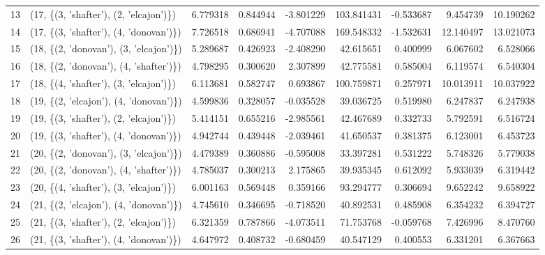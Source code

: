 \begin{tabular}{llrrrrrrr}
13 &  (17, \{(3, 'shafter'), (2, 'elcajon')\}) &  6.779318 &   0.844944 & -3.801229 &  103.841431 & -0.533687 &   9.454739 &  10.190262 \\
14 &  (17, \{(3, 'shafter'), (4, 'donovan')\}) &  7.726518 &   0.686941 & -4.707088 &  169.548332 & -1.532631 &  12.140497 &  13.021073 \\
15 &  (18, \{(2, 'donovan'), (3, 'elcajon')\}) &  5.289687 &   0.426923 & -2.408290 &   42.615651 &  0.400999 &   6.067602 &   6.528066 \\
16 &  (18, \{(2, 'donovan'), (4, 'shafter')\}) &  4.798295 &   0.300620 &  2.307899 &   42.775581 &  0.585004 &   6.119574 &   6.540304 \\
17 &  (18, \{(4, 'shafter'), (3, 'elcajon')\}) &  6.113681 &   0.582747 &  0.693867 &  100.759871 &  0.257971 &  10.013911 &  10.037922 \\
18 &  (19, \{(2, 'elcajon'), (4, 'donovan')\}) &  4.599836 &   0.328057 & -0.035528 &   39.036725 &  0.519980 &   6.247837 &   6.247938 \\
19 &  (19, \{(3, 'shafter'), (2, 'elcajon')\}) &  5.414151 &   0.655216 & -2.985561 &   42.467689 &  0.332733 &   5.792591 &   6.516724 \\
20 &  (19, \{(3, 'shafter'), (4, 'donovan')\}) &  4.942744 &   0.439448 & -2.039461 &   41.650537 &  0.381375 &   6.123001 &   6.453723 \\
21 &  (20, \{(2, 'donovan'), (3, 'elcajon')\}) &  4.479389 &   0.360886 & -0.595008 &   33.397281 &  0.531222 &   5.748326 &   5.779038 \\
22 &  (20, \{(2, 'donovan'), (4, 'shafter')\}) &  4.785037 &   0.300213 &  2.175865 &   39.935345 &  0.612092 &   5.933039 &   6.319442 \\
23 &  (20, \{(4, 'shafter'), (3, 'elcajon')\}) &  6.001163 &   0.569448 &  0.359166 &   93.294777 &  0.306694 &   9.652242 &   9.658922 \\
24 &  (21, \{(2, 'elcajon'), (4, 'donovan')\}) &  4.745610 &   0.346695 & -0.718520 &   40.892531 &  0.485908 &   6.354232 &   6.394727 \\
25 &  (21, \{(3, 'shafter'), (2, 'elcajon')\}) &  6.321359 &   0.787866 & -4.073511 &   71.753768 & -0.059768 &   7.426996 &   8.470760 \\
26 &  (21, \{(3, 'shafter'), (4, 'donovan')\}) &  4.647972 &   0.408732 & -0.680459 &   40.547129 &  0.400553 &   6.331201 &   6.367663 \\
\bottomrule
\end{tabular}
